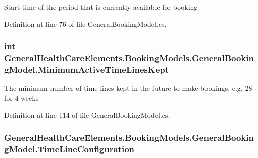 Start time of the period that is currently available for booking 



Definition at line 76 of file General\+Booking\+Model.\+cs.

\subsubsection[{\texorpdfstring{Minimum\+Active\+Time\+Lines\+Kept}{MinimumActiveTimeLinesKept}}]{\setlength{\rightskip}{0pt plus 5cm}int General\+Health\+Care\+Elements.\+Booking\+Models.\+General\+Booking\+Model.\+Minimum\+Active\+Time\+Lines\+Kept\hspace{0.3cm}{\ttfamily [get]}}\hypertarget{class_general_health_care_elements_1_1_booking_models_1_1_general_booking_model_ac7daa3603aa4062600489bbc449aa565}{}\label{class_general_health_care_elements_1_1_booking_models_1_1_general_booking_model_ac7daa3603aa4062600489bbc449aa565}


The minimum number of time lines kept in the future to make bookings, e.\+g. 28 for 4 weeks 



Definition at line 114 of file General\+Booking\+Model.\+cs.

\subsubsection[{\texorpdfstring{Time\+Line\+Configuration}{TimeLineConfiguration}}]{ General\+Health\+Care\+Elements.\+Booking\+Models.\+General\+Booking\+Model.\+Time\+Line\+Configuration\hspace{0.3cm}{\ttfamily [get]}}\hypertarget{class_general_health_care_elements_1_1_booking_models_1_1_general_booking_model_ae9c16f1b889c7f7b936afd196bbe573a}{}\label{class_general_health_care_elements_1_1_booking_models_1_1_general_booking_model_ae9c16f1b889c7f7b936afd196bbe573a}


